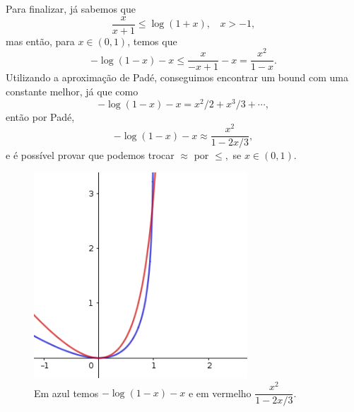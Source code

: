 \documentclass[12pt,a4paper,oneside]{book}
\theoremstyle{definition}
\theoremstyle{remark}
\numberwithin{equation}{section}
\begin{document}
Para finalizar, já sabemos que
$$\dfrac{x}{x+1}\leq \log(1+x),\ \ \ \ x>-1, $$
mas então, para $x\in(0,1)$, temos que
$$ -\log(1-x)-x \leq \dfrac{x}{-x+1}-x = \dfrac{x^2}{1-x}.$$
Utilizando a aproximação de Padé, conseguimos encontrar um bound com uma constante melhor, já que como
$$ -\log(1-x)-x = x^2/2 + x^3/3 + \cdots, $$ 
então por Padé,
$$ -\log(1-x)-x \approx \dfrac{x^2}{1-2x/3},$$
e é possível provar que podemos trocar $\approx$ por $\leq,$ se $x\in(0,1).$


\begin{figure}[h]
\centering %
\includegraphics[width=8cm]{-ln-x} %
\caption{Em azul temos $-\log(1-x)-x$ e em vermelho $  \dfrac{x^2}{1-2x/3}$. }
\end{figure}
 









\nocite{*}


\newpage

\printindex
\end{document}
